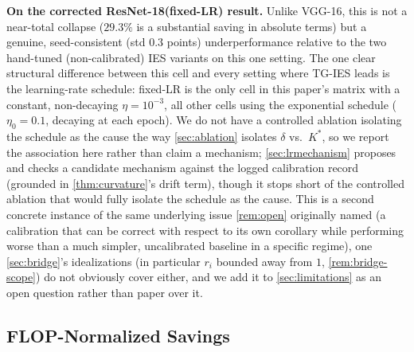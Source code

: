 \documentclass{article}
\theoremstyle{plain}
\theoremstyle{definition}
\theoremstyle{remark}
\begin{document}
\textbf{On the corrected ResNet-18(fixed-LR) result.} Unlike VGG-16, this is not a near-total collapse ($29.3\%$ is a substantial saving in absolute terms) but a genuine, seed-consistent (std $0.3$ points) underperformance relative to the two hand-tuned (non-calibrated) IES variants on this one setting. The one clear structural difference between this cell and every setting where TG-IES leads is the learning-rate schedule: fixed-LR is the only cell in this paper's matrix with a constant, non-decaying $\eta{=}10^{-3}$, all other cells using the exponential schedule ($\eta_0{=}0.1$, decaying at each epoch). We do not have a controlled ablation isolating the schedule as the cause the way \cref{sec:ablation} isolates $\delta$ vs.\ $K^*$, so we report the association here rather than claim a mechanism; \cref{sec:lrmechanism} proposes and checks a candidate mechanism against the logged calibration record (grounded in \cref{thm:curvature}'s drift term), though it stops short of the controlled ablation that would fully isolate the schedule as the cause. This is a second concrete instance of the same underlying issue \cref{rem:open} originally named (a calibration that can be correct with respect to its own corollary while performing worse than a much simpler, uncalibrated baseline in a specific regime), one \cref{sec:bridge}'s idealizations (in particular $r_i$ bounded away from $1$, \cref{rem:bridge-scope}) do not obviously cover either, and we add it to \cref{sec:limitations} as an open question rather than paper over it.

\subsection{FLOP-Normalized Savings}
\label{sec:flops}
\end{document}
